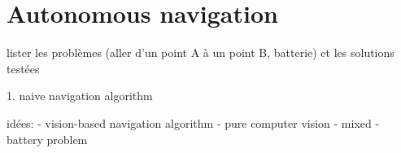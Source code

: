 \chapter{Autonomous navigation}

lister les problèmes (aller d'un point A à un point B, batterie) et les solutions testées

1. naive navigation algorithm

idées:
- vision-based navigation algorithm
- pure computer vision
- mixed
- battery problem
